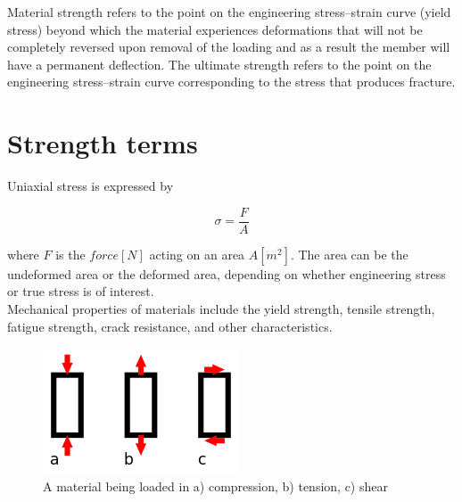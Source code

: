 Material strength refers to the point on the engineering stress–strain curve (yield stress) beyond which the material experiences deformations that will not be completely reversed upon removal of the loading and as a result the member will have a permanent deflection. The ultimate strength refers to the point on the engineering stress–strain curve corresponding to the stress that produces fracture.

\section{Strength terms}
Uniaxial stress is expressed by

\begin{equation}\label{eq: uniaxial stress}
\sigma ={\frac{F}{A}}
\end{equation} 

where $ F $ is the $ force [N] $ acting on an area $ A [m^2] $. The area can be the undeformed area or the deformed area, depending on whether engineering stress or true stress is of interest.\\

Mechanical properties of materials include the yield strength, tensile strength, fatigue strength, crack resistance, and other characteristics. \\

\begin{figure}[h!]
\centering
\includegraphics[width=0.3\linewidth]{figures/Compressive_tensile_shear_loading}
\caption{A material being loaded in a) compression, b) tension, c) shear}
\label{fig:compressivetensileshearloading}
\end{figure}

